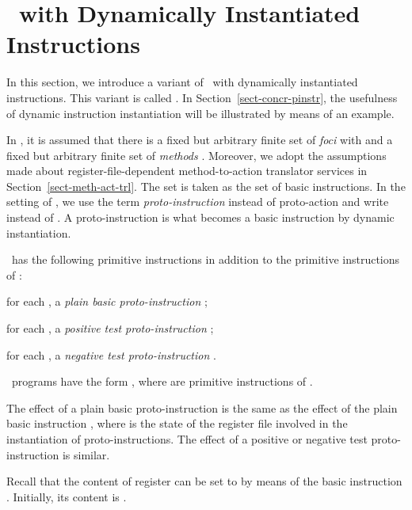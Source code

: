 \documentclass[fleqn]{llncs}
\begin{document}
\section{\PGLD\ with Dynamically Instantiated Instructions}
\label{sect-PGLDdii}

In this section, we introduce a variant of \PGLD\ with dynamically
instantiated instructions.
This variant is called \PGLDdii.
In Section~\ref{sect-concr-pinstr}, the usefulness of dynamic
instruction instantiation will be illustrated by means of an example.

In \PGLDdii, it is assumed that there is a fixed but arbitrary finite set
of \emph{foci}  with  and a fixed but arbitrary
finite set of \emph{methods} .
Moreover, we adopt the assumptions made about register-file-dependent
method-to-action translator services in Section~\ref{sect-meth-act-trl}.
The set  is taken
as the set  of basic instructions.
In the setting of \PGLDdii, we use the term \emph{proto-instruction}
instead of proto-action and write  instead of .
A proto-instruction is what becomes a basic instruction by dynamic
instantiation.

\PGLDdii\ has the following primitive instructions in addition to the
primitive instructions of \PGLD:
\begin{iteml}
\item
for each , a \emph{plain basic proto-instruction} ;
\item
for each , a \emph{positive test proto-instruction}
;
\item
for each , a \emph{negative test proto-instruction}
.
\end{iteml}
\PGLDdii\ programs have the form , where
 are primitive instructions of \PGLDdii.

The effect of a plain basic proto-instruction  is the same as the
effect of the plain basic instruction , where  is the
state of the register file involved in the instantiation of
proto-instructions.
The effect of a positive or negative test proto-instruction is similar.

Recall that the content of register  can be set to  by means of
the basic instruction .
Initially, its content is .
\end{document}
